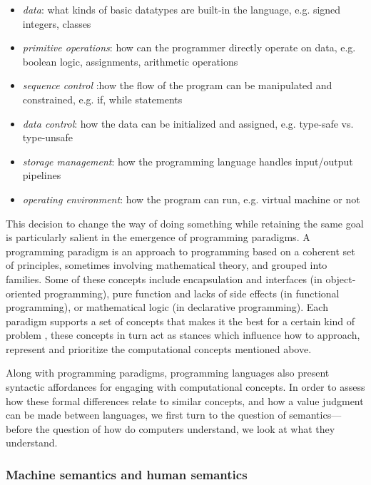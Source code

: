 \begin{itemize}
  \item{\emph{data}: what kinds of basic datatypes are built-in the language, e.g. signed integers, classes}
  \item{\emph{primitive operations}: how can the programmer directly operate on data, e.g. boolean logic, assignments, arithmetic operations}
  \item{\emph{sequence control} :how the flow of the program can be manipulated and constrained, e.g. if, while statements}
  \item{\emph{data control}: how the data can be initialized and assigned, e.g. type-safe vs. type-unsafe}
  \item{\emph{storage management}: how the programming language handles input/output pipelines}
  \item{\emph{operating environment}: how the program can run, e.g. virtual machine or not}
\end{itemize}

This decision to change the way of doing something while retaining the same goal is particularly salient in the emergence of programming paradigms. A programming paradigm is an approach to programming based on a coherent set of principles, sometimes involving mathematical theory, and grouped into families. Some of these concepts include encapsulation and interfaces (in object-oriented programming), pure function and lacks of side effects (in functional programming), or mathematical logic (in declarative programming). Each paradigm supports a set of concepts that makes it the best for a certain kind of problem \citep{vanroy_programming_2012}, these concepts in turn act as stances which influence how to approach, represent and prioritize the computational concepts mentioned above.

Along with programming paradigms, programming languages also present syntactic affordances for engaging with computational concepts. In order to assess how these formal differences relate to similar concepts, and how a value judgment can be made between languages, we first turn to the question of semantics—before the question of how do computers understand, we look at what they understand.

\subsubsection{Machine semantics and human semantics}
\label{subsubsec:machine-semantics-human-semantics}

